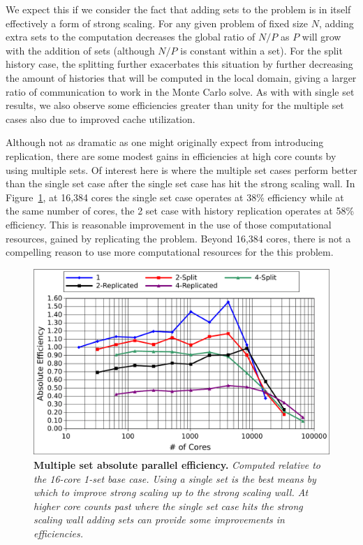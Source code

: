 We expect this if we consider the fact that adding sets to the problem
is in itself effectively a form of strong scaling. For any given
problem of fixed size $N$, adding extra sets to the computation
decreases the global ratio of $N/P$ as $P$ will grow with the addition
of sets (although $N/P$ is constant within a set). For the split
history case, the splitting further exacerbates this situation by
further decreasing the amount of histories that will be computed in
the local domain, giving a larger ratio of communication to work in
the Monte Carlo solve. As with with single set results, we also
observe some efficiencies greater than unity for the multiple set
cases also due to improved cache utilization. 

Although not as dramatic as one might originally expect from
introducing replication, there are some modest gains in efficiencies
at high core counts by using multiple sets. Of interest here is where
the multiple set cases perform better than the single set case after
the single set case has hit the strong scaling wall. In
Figure~\ref{fig:titan_strong_ms_eff}, at 16,384 cores the single set
case operates at 38\% efficiency while at the same number of cores,
the 2 set case with history replication operates at 58\%
efficiency. This is reasonable improvement in the use of those
computational resources, gained by replicating the problem. Beyond
16,384 cores, there is not a compelling reason to use more
computational resources for the this problem.

\begin{figure}[t!]
  \begin{center}
    \includegraphics[width=6in]{chapters/parallel_mc/titan_strong_ms_eff.pdf}
  \end{center}
  \caption{\textbf{Multiple set absolute parallel efficiency.}
    \textit{Computed relative to the 16-core 1-set base case. Using a
      single set is the best means by which to improve strong scaling
      up to the strong scaling wall. At higher core counts past where
      the single set case hits the strong scaling wall adding sets can
      provide some improvements in efficiencies.}}
  \label{fig:titan_strong_ms_eff}
\end{figure}

